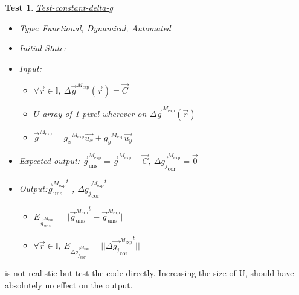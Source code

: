 \documentclass[12pt, titlepage]{article}
\newtheorem{Test}{Test}
\begin{document}
\begin{Test}\normalfont\underline{Test-constant-delta-g}
\label{T_constant-delta-g}
\begin{itemize}
\item Type: Functional, Dynamical, Automated
\item Initial State: 
\item Input: 
	\begin{itemize}
	\item $\forall \vec{r} \in \mathbb{I}, \  \Delta \overrightarrow{g}^{M_{\text{exp}}}(\vec{r})=\overrightarrow{C}$
	\item $U$ array of 1 pixel wherever on $\Delta \overrightarrow{g}^{M_{\text{exp}}}(\vec{r})$
	\item $\overrightarrow{g}^{M_{\text{exp}}}={g_x}^{M_{\text{exp}}}\overrightarrow{u_x}+{g_y}^{M_{\text{exp}}}\overrightarrow{u_y}$
	\end{itemize} 
\item Expected output: $\overrightarrow{g}_{\text{uns}}^{M_{\text{exp}}}=\overrightarrow{g}^{M_{\text{exp}}}-\overrightarrow{C}$, $\Delta\overrightarrow{g_{j}}_{\text{cor}}^{M_{\text{exp}}}=\overrightarrow{0}$
\item Output:${\overrightarrow{g}_{\text{uns}}^{M_{\text{exp}}}}^{t}$ , ${\Delta\overrightarrow{g_{j}}_{\text{cor}}^{M_{\text{exp}}}}^{t}$
	\begin{itemize}
	\item $E_{\overrightarrow{g}_{\text{uns}}^{M_{\text{exp}}}}=||{\overrightarrow{g}_{\text{uns}}^{M_{\text{exp}}}}^{t}-\overrightarrow{g}_{\text{uns}}^{M_{\text{exp}}}||$
	\item $\forall \vec{r} \in \mathbb{I}, \ E_{\Delta\overrightarrow{g_{j}}_{\text{cor}}^{M_{\text{exp}}}}=||{\Delta\overrightarrow{g_{j}}_{\text{cor}}^{M_{\text{exp}}}}^{t}||$
	\end{itemize}
\end{itemize}
\end{Test}

 is not realistic but test the code
directly. Increasing the size of U, should have absolutely no effect on the output. 
\end{document}
